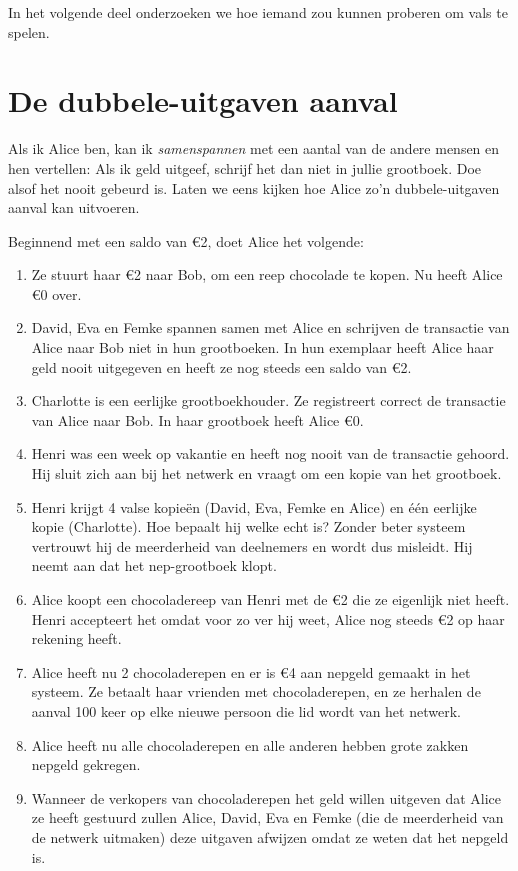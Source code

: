\documentclass[smalldemyvopaper,11pt,twoside,onecolumn,openright,extrafontsizes]{memoir}
\begin{document}
In het volgende deel onderzoeken we hoe iemand zou kunnen proberen om vals te spelen.

\section{De dubbele-uitgaven aanval}

Als ik Alice ben, kan ik \textit{samenspannen} met een aantal van de andere mensen en hen vertellen: \textquotedbl{}Als ik geld uitgeef, schrijf het dan niet in jullie grootboek. Doe alsof het nooit gebeurd is.\textquotedbl{} Laten we eens kijken hoe Alice zo'n dubbele-uitgaven aanval kan uitvoeren.

Beginnend met een saldo van €2, doet Alice het volgende:

\begin{enumerate}
    \item Ze stuurt haar €2 naar Bob, om een reep chocolade te kopen. Nu heeft Alice €0 over.
    \item David, Eva en Femke spannen samen met Alice en schrijven de transactie van Alice naar Bob niet in hun grootboeken. In hun exemplaar heeft Alice haar geld nooit uitgegeven en heeft ze nog steeds een saldo van €2.
    \item Charlotte is een eerlijke grootboekhouder. Ze registreert correct de transactie van Alice naar Bob. In haar grootboek heeft Alice €0.
    \item Henri was een week op vakantie en heeft nog nooit van de transactie gehoord. Hij sluit zich aan bij het netwerk en vraagt om een kopie van het grootboek.
    \item Henri krijgt 4 valse kopieën (David, Eva, Femke en Alice) en één eerlijke kopie (Charlotte). Hoe bepaalt hij welke echt is? Zonder beter systeem vertrouwt hij de meerderheid van deelnemers en wordt dus misleidt. Hij neemt aan dat het nep-grootboek klopt.
    \item Alice koopt een chocoladereep van Henri met de €2 die ze eigenlijk niet heeft. Henri accepteert het omdat voor zo ver hij weet, Alice nog steeds €2 op haar rekening heeft.
    \item Alice heeft nu 2 chocoladerepen en er is €4 aan nepgeld gemaakt in het systeem. Ze betaalt haar vrienden met chocoladerepen, en ze herhalen de aanval 100 keer op elke nieuwe persoon die lid wordt van het netwerk.
    \item Alice heeft nu alle chocoladerepen en alle anderen hebben grote zakken nepgeld gekregen.
    \item Wanneer de verkopers van chocoladerepen het geld willen uitgeven dat Alice ze heeft gestuurd zullen Alice, David, Eva en Femke (die de meerderheid van de netwerk uitmaken) deze uitgaven afwijzen omdat ze weten dat het nepgeld is.
\end{enumerate}
\end{document}
